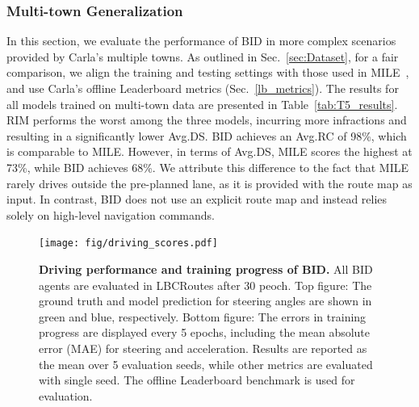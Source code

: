 \subsubsection{Multi-town Generalization}\label{sec:multi_towns_result}
\hspace{1pc}In this section, we evaluate the performance of BID in more complex scenarios provided by Carla's multiple towns. 
As outlined in Sec.~\ref{sec:Dataset}, for a fair comparison, we align the training and testing settings with those used in MILE~\cite{Hu:2022}, and use Carla's offline Leaderboard metrics (Sec.~\ref{lb_metrics}). 
The results for all models trained on multi-town data are presented in Table~\ref{tab:T5_results}. 
RIM performs the worst among the three models, incurring more infractions and resulting in a significantly lower Avg.DS. 
BID achieves an Avg.RC of 98\%, which is comparable to MILE. 
However, in terms of Avg.DS, MILE scores the highest at 73\%, while BID achieves 68\%. 
We attribute this difference to the fact that MILE rarely drives outside the pre-planned lane, as it is provided with the route map as input. 
In contrast, BID does not use an explicit route map and instead relies solely on high-level navigation commands.

\begin{figure}[t]
	\centering
	\texttt{[image: fig/driving\_scores.pdf]}
	\vspace{-1ex}
	\caption{\textbf{Driving performance and training progress of BID.} 
		All BID agents are evaluated in LBCRoutes after 30 peoch.
		Top figure: The ground truth and model prediction for steering angles are shown in green and blue, respectively.
		Bottom figure: The errors in training progress are displayed every 5 epochs, including the mean absolute error (MAE) for steering and acceleration.
		Results are reported as the mean over 5 evaluation seeds, while other metrics are evaluated with single seed. 
		The offline Leaderboard benchmark is used for evaluation.}
	\vspace{-1.5ex}
	\label{fig:score_eu_lb_tt_tn}
\end{figure}


